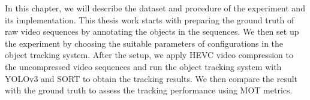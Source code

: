 In this chapter, we will describe the dataset and procedure of the experiment and its implementation. This thesis work starts with preparing the ground truth of raw video sequences by annotating the objects in the sequences. We then set up the experiment by choosing the suitable parameters of configurations in the object tracking system. After the setup, we apply HEVC video compression to the uncompressed video sequences and run the object tracking system with YOLOv3 and SORT to obtain the tracking results. We then compare the result with the ground truth to assess the tracking performance using MOT metrics.